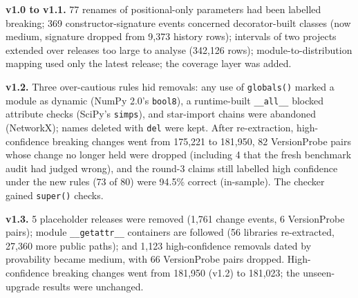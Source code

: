 \documentclass[10pt,twocolumn,letterpaper]{article}
\begin{document}
\textbf{v1.0 to v1.1.} 77 renames of positional-only parameters had been labelled breaking; 369
constructor-signature events concerned decorator-built classes (now medium, signature dropped from 9,373
history rows); intervals of two projects extended over releases too large to analyse (342,126 rows); module-to-distribution mapping used only the latest release; the coverage layer was added.

\textbf{v1.2.} Three over-cautious rules hid removals: any use of \texttt{globals()} marked a module as dynamic (NumPy
2.0's \texttt{bool8}), a runtime-built \texttt{\_\_all\_\_} blocked attribute checks (SciPy's \texttt{simps}), and
star-import chains were abandoned (NetworkX); names deleted with \texttt{del} were kept. After re-extraction,
high-confidence breaking changes went from 175,221 to 181,950, 82 VersionProbe
pairs whose change no longer held were dropped (including 4 that the fresh benchmark audit had
judged wrong), and the round-3 claims still labelled high confidence under the new rules (73 of 80) were
94.5\% correct (in-sample). The checker gained \texttt{super()} checks.

\textbf{v1.3.} 5 placeholder releases were removed (1,761 change events, 6
VersionProbe pairs); module \texttt{\_\_getattr\_\_} containers are followed (56 libraries re-extracted,
27,360 more public paths); and 1,123 high-confidence removals dated by provability became medium,
with 66 VersionProbe pairs dropped. High-confidence breaking changes went from 181,950 (v1.2) to
181,023; the unseen-upgrade results were unchanged.
\end{document}
